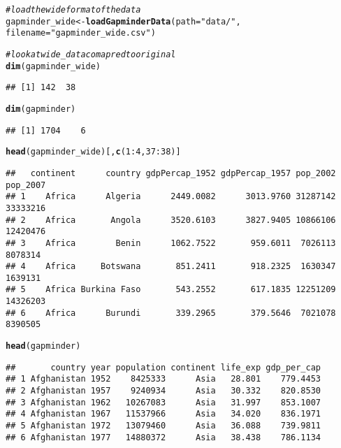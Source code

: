 \documentclass[english]{article}\usepackage[]{graphicx}\usepackage[]{color}
\makeatletter
\newcommand{\hlnum}[1]{\textcolor[rgb]{0.686,0.059,0.569}{#1}}%
\newcommand{\hlstr}[1]{\textcolor[rgb]{0.192,0.494,0.8}{#1}}%
\newcommand{\hlcom}[1]{\textcolor[rgb]{0.678,0.584,0.686}{\textit{#1}}}%
\newcommand{\hlopt}[1]{\textcolor[rgb]{0,0,0}{#1}}%
\newcommand{\hlstd}[1]{\textcolor[rgb]{0.345,0.345,0.345}{#1}}%
\newcommand{\hlkwb}[1]{\textcolor[rgb]{0.69,0.353,0.396}{#1}}%
\newcommand{\hlkwc}[1]{\textcolor[rgb]{0.333,0.667,0.333}{#1}}%
\newcommand{\hlkwd}[1]{\textcolor[rgb]{0.737,0.353,0.396}{\textbf{#1}}}%
\newenvironment{kframe}{%
 \def\at@end@of@kframe{}%
 \ifinner\ifhmode%
  \def\at@end@of@kframe{\end{minipage}}%
  \begin{minipage}{\columnwidth}%
 \fi\fi%
 \def\FrameCommand##1{\hskip\@totalleftmargin \hskip-\fboxsep
 \colorbox{shadecolor}{##1}\hskip-\fboxsep
     \hskip-\linewidth \hskip-\@totalleftmargin \hskip\columnwidth}%
 \MakeFramed {\advance\hsize-\width
   \@totalleftmargin\z@ \linewidth\hsize
   \@setminipage}}%
 {\par\unskip\endMakeFramed%
 \at@end@of@kframe}
\newenvironment{knitrout}{}{} %
\makeatother
\begin{document}
\begin{knitrout}
\color{fgcolor}\begin{kframe}
\begin{alltt}
\hlcom{# load the wide format of the data}
\hlstd{gapminder_wide} \hlkwb{<-} \hlkwd{loadGapminderData}\hlstd{(}\hlkwc{path} \hlstd{=} \hlstr{"data/"}\hlstd{,}
                                    \hlkwc{filename} \hlstd{=} \hlstr{"gapminder_wide.csv"}\hlstd{)}

\hlcom{# look at wide_data comapred to original }
\hlkwd{dim}\hlstd{(gapminder_wide)}
\end{alltt}
\begin{verbatim}
## [1] 142  38
\end{verbatim}
\begin{alltt}
\hlkwd{dim}\hlstd{(gapminder)}
\end{alltt}
\begin{verbatim}
## [1] 1704    6
\end{verbatim}
\begin{alltt}
\hlkwd{head}\hlstd{(gapminder_wide)[,} \hlkwd{c}\hlstd{(}\hlnum{1}\hlopt{:}\hlnum{4}\hlstd{,} \hlnum{37}\hlopt{:}\hlnum{38}\hlstd{)]}
\end{alltt}
\begin{verbatim}
##   continent      country gdpPercap_1952 gdpPercap_1957 pop_2002 pop_2007
## 1    Africa      Algeria      2449.0082      3013.9760 31287142 33333216
## 2    Africa       Angola      3520.6103      3827.9405 10866106 12420476
## 3    Africa        Benin      1062.7522       959.6011  7026113  8078314
## 4    Africa     Botswana       851.2411       918.2325  1630347  1639131
## 5    Africa Burkina Faso       543.2552       617.1835 12251209 14326203
## 6    Africa      Burundi       339.2965       379.5646  7021078  8390505
\end{verbatim}
\begin{alltt}
\hlkwd{head}\hlstd{(gapminder)}
\end{alltt}
\begin{verbatim}
##       country year population continent life_exp gdp_per_cap
## 1 Afghanistan 1952    8425333      Asia   28.801    779.4453
## 2 Afghanistan 1957    9240934      Asia   30.332    820.8530
## 3 Afghanistan 1962   10267083      Asia   31.997    853.1007
## 4 Afghanistan 1967   11537966      Asia   34.020    836.1971
## 5 Afghanistan 1972   13079460      Asia   36.088    739.9811
## 6 Afghanistan 1977   14880372      Asia   38.438    786.1134
\end{verbatim}
\end{kframe}
\end{knitrout}
\end{document}
